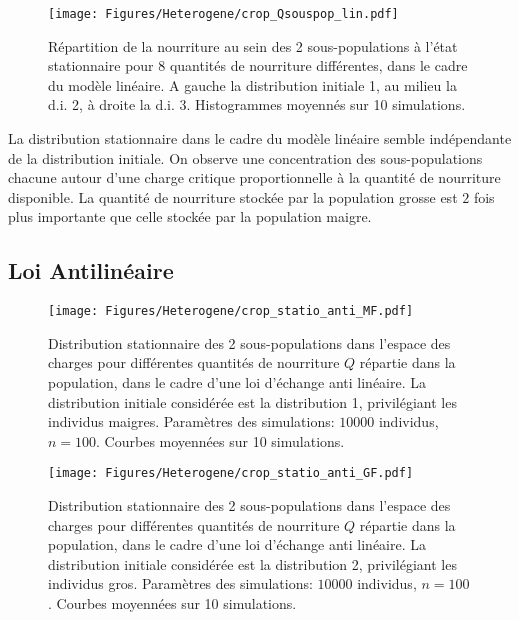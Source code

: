 \begin{figure}[h!]
\centering
\texttt{[image: Figures/Heterogene/crop\_Qsouspop\_lin.pdf]}
\caption{Répartition de la nourriture au sein des 2 sous-populations à l'état stationnaire pour 8 quantités de nourriture différentes, dans le cadre du modèle linéaire. A gauche la distribution initiale 1, au milieu la d.i. 2, à droite la d.i. 3. Histogrammes moyennés sur 10 simulations.}
\label{Qsouspop_lin}
\end{figure}

La distribution stationnaire dans le cadre du modèle linéaire semble indépendante de la distribution initiale. On observe une concentration des sous-populations chacune autour d'une charge critique proportionnelle à la quantité de nourriture disponible. La quantité de nourriture stockée par la population grosse est $2$ fois plus importante que celle stockée par la population maigre.



\clearpage

\subsection{Loi Antilinéaire}

\begin{figure}[h!]
\centering
\texttt{[image: Figures/Heterogene/crop\_statio\_anti\_MF.pdf]}
\caption{Distribution stationnaire des 2 sous-populations dans l'espace des charges pour différentes quantités de nourriture $Q$ répartie dans la population, dans le cadre d'une loi d'échange anti linéaire. La distribution initiale considérée est la distribution 1, privilégiant les individus maigres. Paramètres des simulations: $10000$ individus, $n=100$. Courbes moyennées sur 10 simulations.}
\label{statio_anti_MF}
\end{figure}

\begin{figure}[h!]
\centering
\texttt{[image: Figures/Heterogene/crop\_statio\_anti\_GF.pdf]}
\caption{Distribution stationnaire des 2 sous-populations dans l'espace des charges pour différentes quantités de nourriture $Q$ répartie dans la population, dans le cadre d'une loi d'échange anti linéaire. La distribution initiale considérée est la distribution 2, privilégiant les individus gros. Paramètres des simulations: $10000$ individus, $n=100$. Courbes moyennées sur 10 simulations.}
\label{statio_anti_GF}
\end{figure}

